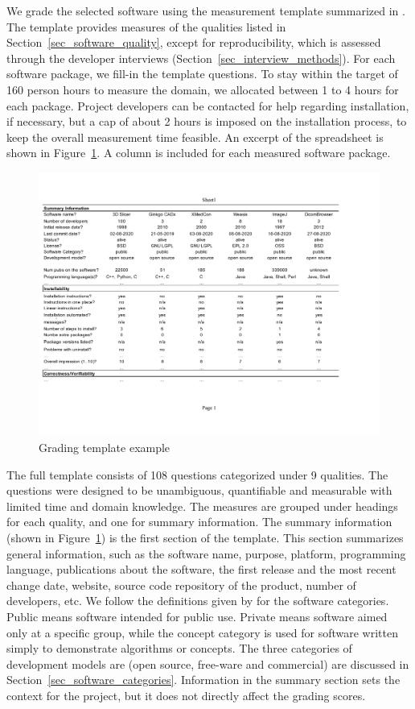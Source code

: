 \documentclass[final, 3p, times, authoryear]{elsarticle}
\begin{document}
We grade the selected software using the measurement template summarized in
\citet{SmithEtAl2021}.  The template provides measures of the qualities listed
in Section~\ref{sec_software_quality}, except for reproducibility, which is
assessed through the developer interviews (Section~\ref{sec_interview_methods}).
For each software package, we fill-in the template questions. To stay within the
target of 160 person hours to measure the domain, we allocated between 1 to 4
hours for each package. Project developers can be contacted for help regarding
installation, if necessary, but a cap of about 2 hours is imposed on the
installation process, to keep the overall measurement time feasible. An excerpt
of the spreadsheet is shown in Figure~\ref{fg_grading_template_example}.  A
column is included for each measured software package. 

\begin{figure}[!ht]
\includegraphics[scale=0.67]{figures/template.pdf}
\caption{Grading template example}
\label{fg_grading_template_example}
\end{figure}

The full template consists of 108 questions categorized under 9 qualities.  The
questions were designed to be unambiguous, quantifiable and measurable with
limited time and domain knowledge. The measures are grouped under headings for
each quality, and one for summary information. The summary information (shown in
Figure~\ref{fg_grading_template_example}) is the first section of the template.
This section summarizes general information, such as the software name, purpose,
platform, programming language, publications about the software, the first
release and the most recent change date, website, source code repository of the
product, number of developers, etc.  We follow the definitions given by
\citet{GewaltigAndCannon2012} for the software categories.  Public means
software intended for public use.  Private means software aimed only at a
specific group, while the concept category is used for software written simply
to demonstrate algorithms or concepts. The three categories of development
models are (open source, free-ware and commercial) are discussed in
Section~\ref{sec_software_categories}.  Information in the summary section sets
the context for the project, but it does not directly affect the grading scores.
\end{document}
